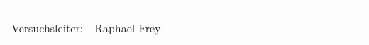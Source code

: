 \begin{titlepage}

    \maketitle

    \vspace{10mm}

    \vspace{12cm}
    \rule{\textwidth}{0.4pt}
    \Huge
    \begin{center}
    \begin{tabular}{lr}

        Versuchsleiter: & Raphael Frey \\

    \end{tabular}
    \end{center}
    \normalsize

\end{titlepage}
